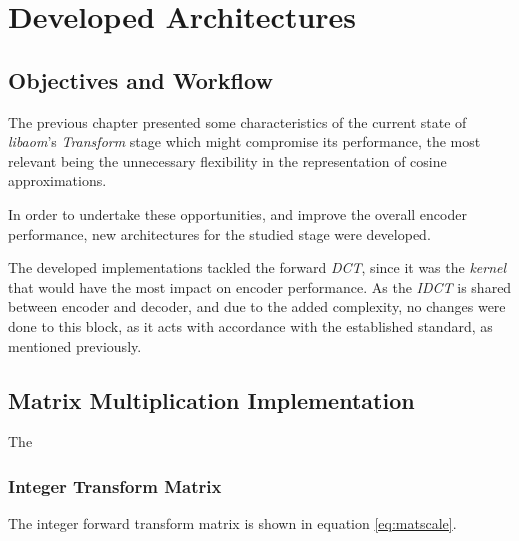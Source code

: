\cleardoublepage
\chapter{Developed Architectures}

\section{Objectives and Workflow}

The previous chapter presented some characteristics of the current state of \emph{libaom}'s \emph{Transform} stage which might compromise its performance, the most relevant being the unnecessary flexibility in the representation of cosine approximations.

In order to undertake these opportunities, and improve the overall encoder performance, new architectures for the studied stage were developed.

The developed implementations tackled the forward \emph{DCT}, since it was the \emph{kernel} that would have the most impact on encoder performance. As the \emph{IDCT} is shared between encoder and decoder, and due to the added complexity, no changes were done to this block, as it acts with accordance with the established standard, as mentioned previously. 

\section{Matrix Multiplication Implementation}


The 

\subsection{Integer Transform Matrix}

The integer forward transform matrix is shown in equation \ref{eq:matscale}.

